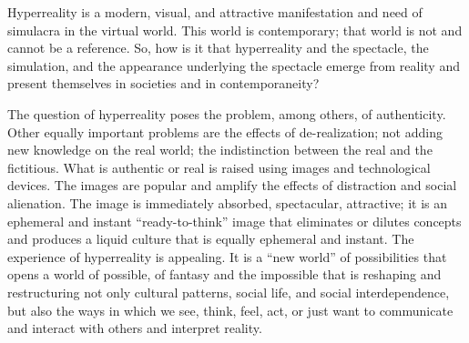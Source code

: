 \documentclass[english]{textolivre}
\begin{document}

Hyperreality is a modern, visual, and attractive manifestation and need of simulacra in the virtual world. This world is contemporary; that world is not and cannot be a reference. So, how is it that hyperreality and the spectacle, the simulation, and the appearance underlying the spectacle emerge from reality and present themselves in societies and in contemporaneity?

The question of hyperreality poses the problem, among others, of authenticity. Other equally important problems are the effects of de-realization; not adding new knowledge on the real world; the indistinction between the real and the fictitious. What is authentic or real is raised using images and technological devices. The images are popular and amplify the effects of distraction and social alienation. The image is immediately absorbed, spectacular, attractive; it is an ephemeral and instant “ready-to-think” image that eliminates or dilutes concepts and produces a liquid culture that is equally ephemeral and instant. The experience of hyperreality is appealing. It is a “new world” of possibilities that opens a world of possible, of fantasy and the impossible that is reshaping and restructuring not only cultural patterns, social life, and social interdependence, but also the ways in which we see, think, feel, act, or just want to communicate and interact with others and interpret reality.
\end{document}
